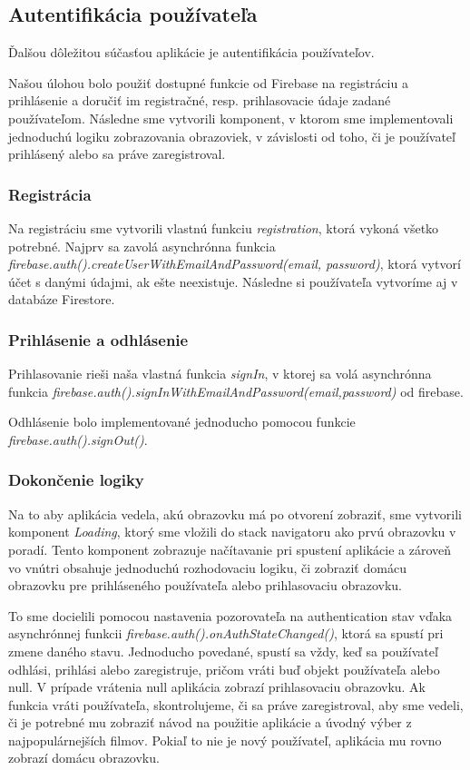 \subsection{Autentifikácia používateľa}
Ďalšou dôležitou súčasťou aplikácie je autentifikácia používateľov.

Našou úlohou bolo použiť dostupné funkcie od Firebase na registráciu a prihlásenie a doručiť im registračné, resp. prihlasovacie údaje zadané používateľom. Následne sme vytvorili komponent, v ktorom sme implementovali jednoduchú logiku zobrazovania obrazoviek, v závislosti od toho, či je používateľ prihlásený alebo sa práve zaregistroval.
\subsubsection{Registrácia}
Na registráciu sme vytvorili vlastnú funkciu \textit{registration}, ktorá vykoná všetko potrebné. Najprv sa zavolá asynchrónna funkcia \textit{firebase.auth().createUserWithEmailAndPassword(email, password)}, ktorá vytvorí účet s danými údajmi, ak ešte neexistuje. Následne si používateľa vytvoríme aj v databáze Firestore. 
\subsubsection{Prihlásenie a odhlásenie}
Prihlasovanie rieši naša vlastná funkcia \textit{signIn}, v ktorej sa volá asynchrónna funkcia \textit{firebase.auth().signInWithEmailAndPassword(email,password)} od firebase. 

Odhlásenie bolo implementované jednoducho pomocou funkcie \textit{firebase.auth().signOut()}.
\subsubsection{Dokončenie logiky}
Na to aby aplikácia vedela, akú obrazovku má po otvorení zobraziť, sme vytvorili komponent \textit{Loading}, ktorý sme vložili do stack navigatoru ako prvú obrazovku v poradí. Tento komponent zobrazuje načítavanie pri spustení aplikácie a zároveň vo vnútri obsahuje jednoduchú rozhodovaciu logiku, či zobraziť domácu obrazovku pre prihláseného používateľa alebo prihlasovaciu obrazovku. 

To sme docielili pomocou nastavenia pozorovateľa na authentication stav vďaka asynchrónnej funkcii \textit{firebase.auth().onAuthStateChanged()}, ktorá sa spustí pri zmene daného stavu. Jednoducho povedané, spustí sa vždy, keď sa používateľ odhlási, prihlási alebo zaregistruje, pričom vráti buď objekt používateľa alebo null. V prípade vrátenia null aplikácia zobrazí prihlasovaciu obrazovku. Ak funkcia vráti používateľa, skontrolujeme, či sa práve zaregistroval, aby sme vedeli, či je potrebné mu zobraziť návod na použitie aplikácie a úvodný výber z najpopulárnejších filmov. Pokiaľ to nie je nový používateľ, aplikácia mu rovno zobrazí domácu obrazovku. 
